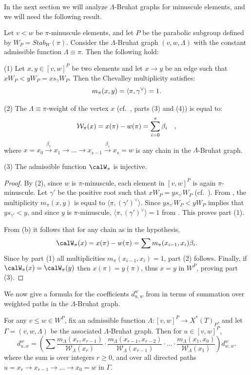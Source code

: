 In the next section we will analyze $\Lambda$-Bruhat graphs for minuscule elements, and we will need the following 
result.
\begin{prop}\label{cor:multweight} Let $v < w$ be $\pi$-minuscule elements, and let $P$ be the parabolic 
subgroup defined by $W_P = Stab_W(\pi)$. Consider the 
$\Lambda$-Bruhat graph $(v,w,\Lambda)$ with 
the constant admissible function $\Lambda \equiv \pi$. Then the following hold:

(1) Let $x,y \in [v,w]^P$ be two elements and let $x \to y$ be an edge such that
$x W_P < y W_P = x s_\gamma W_P$. Then the Chevalley multiplicity 
satisfies:
\[ m_\pi(x,y) = \langle \pi, \gamma^\vee \rangle  =1 \/. \] 

(2) The $\Lambda\equiv \pi$-weight of the vertex $x$ (cf.~, parts (3) and (4)) is equal to: 
\[\mathcal{W}_\pi(x) = x(\pi) - w(\pi) = 
\sum_{i=0}^s \beta_i \quad \/, \]
where 
$x=x_0\overset{\beta_1}{\to} x_{1}\to \ldots \to x_{s-1}\overset{\beta_{s}}{\to} x_s =w$ 
is any chain in the $\Lambda$-Bruhat graph.

(3) The admissible function $\calW_\pi$ is injective.
\end{prop}
\begin{proof} By (2), since $w$ is $\pi$-minuscule, each element in 
$[v,w]^P$ is again 
$\pi$-minuscule. Let $\gamma'$ be the positive root such that $xW_P = y s_{\gamma'}W_P$ (cf.~).
From , the multiplicity
$m_\pi(x,y)$ is equal to $\langle \pi, (\gamma')^\vee \rangle$. Since $y s_{\gamma'} W_P < y W_P$ 
implies that $y s_{\gamma'} < y$, and since $y$ is $\pi$-minuscule,
$\langle \pi, (\gamma')^\vee \rangle = 1$ from . This proves part (1). 

From (b) it follows that for any chain as in the hypothesis,
\[\calW_\pi(x) = x(\pi) - w(\pi) = \sum m_\pi(x_{i-1}, x_{i}) \beta_i \/. \]
Since by part (1) all multiplicities $m_\pi(x_{i-1}, x_{i})=1$, part (2) follows.
Finally, if $\calW_\pi(x) = \calW_\pi(y)$ then $x(\pi) = y(\pi)$, thus $x=y$ in $W^P$,
proving part (3).
\end{proof}


We now give a formula for the coefficients $d_{u,w}^w$ from  in terms of summation 
over weighted paths in the $\Lambda$-Bruhat graph. 
\begin{prop}\label{prop:d_P}
For any $v\leq  w\in W^P$, fix an admissible function $\Lambda:[v,w]^P\to X^{*}(T)_P$, 
and let $\Gamma=(v,w,\Lambda)$ be the associated $\Lambda$-Bruhat graph. Then for $u\in [v,w]^P$,
\begin{equation}\label{eq:d}
d_{u,w}^w=\left(
\sum \frac{m_\Lambda(x_{r},x_{r-1})}{\mathcal{W}_\Lambda(x_{r})} \cdot \frac{m_\Lambda(x_{r-1},x_{r-2})}{\mathcal{W}_\Lambda(x_{r-1})}\cdot \ldots \cdot
\frac{m_\Lambda(x_1,x_0)}{\mathcal{W}_\Lambda(x_1)} \right)d_{w,w}^w .
\end{equation} where the sum is over integers $r \ge 0$, and over all directed paths 
$u= x_r \overset{}{\to} x_{r-1} \overset{}{\to} \ldots \overset{}{\to} x_0 = w$ in $\Gamma$. 
\end{prop}

